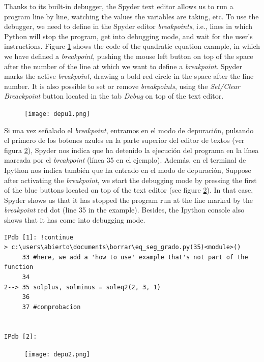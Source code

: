 \begin{paracol}{2}
Thanks to its built-in debugger, the Spyder text editor allows us to run a program line by line, watching the values the variables are taking, etc. To use the debugger, we need to define in the Spyder editor \emph{breakpoints}, i.e., lines in which Python will stop the program, get into debugging mode, and wait for the user's instructions. Figure \ref{fig:depu1} shows the code of the quadratic equation example, in which we have defined a \emph{breakpoint}, pushing the mouse left button on top of the space after the number of the line at which we want to define a \emph{breakpoint}. Spyder marks the active \emph{breakpoint}, drawing a bold red circle in the space after the line number. It is also possible to set or remove \emph{breakpoints}, using the \emph{Set/Clear Breackpoint} button located in the tab \emph{Debug} on top of the text editor.
\end{paracol}

\begin{figure}
\centering
\texttt{[image: depu1.png]}
\label{fig:depu1}
\end{figure}

\begin{paracol}{2}
Si una vez señalado el \emph{breakpoint},  entramos en el modo de depuración, pulsando el primero de los botones azules en la parte superior del editor de textos (ver figura \ref{fig:depu2}),
Spyder nos indica que ha detenido la ejecución del programa en la línea marcada por el \emph{breakpoint} (línea 35 en el ejemplo). Además, en el terminal de Ipython nos indica también que ha entrado en el modo de depuración,
\switchcolumn
Suppose after activating the \emph{breakpoint}, we start the debugging mode by pressing the first of the blue buttons located on top of the text editor (see figure \ref{fig:depu2}). In that case, Spyder shows us that it has stopped the program run at the line marked by the \emph{breakpoint} red dot (line 35 in the example). Besides, the Ipython console also shows that it has come into debugging mode.
\end{paracol}
\begin{verbatim}
IPdb [1]: !continue
> c:\users\abierto\documents\borrar\eq_seg_grado.py(35)<module>()
     33 #here, we add a 'how to use' example that's not part of the function
     34 
2--> 35 solplus, solminus = soleq2(2, 3, 1)
     36 
     37 #comprobacion


IPdb [2]: 
\end{verbatim}
\begin{figure}
\centering
\texttt{[image: depu2.png]}
\label{fig:depu2}
\end{figure}

